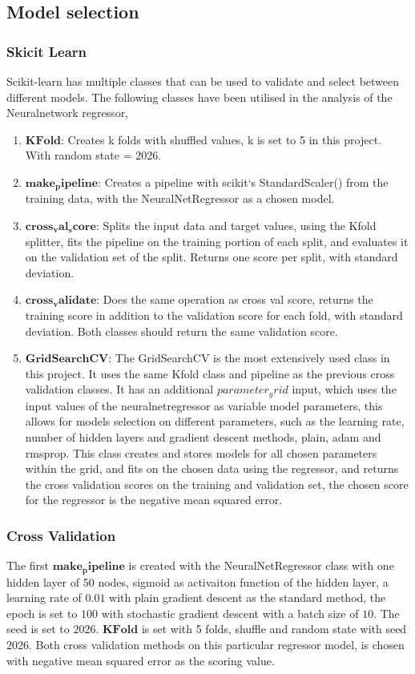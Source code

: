 \subsection{Model selection}
\subsubsection{Skicit Learn}
Scikit-learn has multiple classes that can be used to validate and
select between different models. The following classes have been utilised
in the analysis of the Neuralnetwork regressor, 
\begin{enumerate}
    \item $\mathbf{KFold}$: Creates k folds with shuffled values, k is set to 5 in this project. With random state = 2026.
    \item $\mathbf{make_pipeline}$: Creates a pipeline with scikit`s StandardScaler() from the training data, with the NeuralNetRegressor as a chosen model.
    \item $\mathbf{cross_val_score}$: Splits the input data and target values, using the Kfold splitter, fits the pipeline on the training portion of each split, and evaluates it on the validation set of the split. Returns one score per split, with standard deviation.
    \item $\mathbf{cross_validate}$: Does the same operation as cross val score, returns the training score in addition to the validation score for each fold, with standard deviation. Both classes should return the same validation score.
    \item $\mathbf{GridSearchCV}$: The GridSearchCV is the most extensively used class in this project. It uses the same Kfold class and pipeline as the previous cross validation classes. 
    It has an additional $parameter_grid$ input, which uses the input values of the neuralnetregressor as variable model parameters, this allows for models selection on different parameters, such as 
    the learning rate, number of hidden layers and gradient descent methods, plain, adam and rmsprop. This class creates and stores models for all chosen parameters within the grid, and fits on the chosen data using the regressor, and returns the cross validation scores on the training and validation set, the chosen score for the regressor is the negative mean squared error.
\end{enumerate}
\subsubsection{Cross Validation}
The first $\mathbf{make_pipeline}$ is created with the NeuralNetRegressor class with
one hidden layer of 50 nodes, sigmoid as activaiton function of the hidden layer,
a learning rate of $0.01$ with plain gradient descent as the standard method, 
the epoch is set to $100$ with stochastic gradient descent with a batch size of $10$. 
The seed is set to $2026$. 
$\mathbf{KFold}$ is set with 5 folds, shuffle and random state with seed $2026$.
Both cross validation methods on this particular regressor model, is chosen with negative mean squared error
as the scoring value. 
